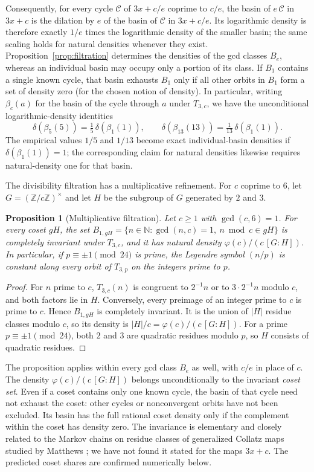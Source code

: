 \documentclass[12pt]{amsart}
\newtheorem{proposition}{Proposition}
\theoremstyle{definition}
\theoremstyle{remark}
\newcommand{\N}{\mathbb{N}}
\begin{document}
Consequently, for every cycle $\mathcal C$ of $3x+c/e$ coprime to $c/e$, the basin of $e\,\mathcal C$ in $3x+c$ is the dilation by $e$ of the basin of $\mathcal C$ in $3x+c/e$. Its logarithmic density is therefore exactly $1/e$ times the logarithmic density of the smaller basin; the same scaling holds for natural densities whenever they exist. Proposition~\ref{prop:filtration} determines the densities of the gcd classes $B_e$, whereas an individual basin may occupy only a portion of its class. If $B_1$ contains a single known cycle, that basin exhausts $B_1$ only if all other orbits in $B_1$ form a set of density zero (for the chosen notion of density). In particular, writing $\beta_c(a)$ for the basin of the cycle through $a$ under $T_{3,c}$, we have the unconditional logarithmic-density identities
\[
\delta(\beta_5(5))=\tfrac15\,\delta(\beta_1(1)),\qquad
\delta(\beta_{13}(13))=\tfrac1{13}\,\delta(\beta_1(1)).
\]
The empirical values $1/5$ and $1/13$ become exact individual-basin densities if $\delta(\beta_1(1))=1$; the corresponding claim for natural densities likewise requires natural-density one for that basin.

The divisibility filtration has a multiplicative refinement. For $c$ coprime to $6$, let $G=(\mathbb Z/c\mathbb Z)^\times$ and let $H$ be the subgroup of $G$ generated by $2$ and $3$.

\begin{proposition}[Multiplicative filtration]
\label{prop:cosets}
Let $c\ge1$ with $\gcd(c,6)=1$. For every coset $gH$, the set $B_{1,gH}=\{n\in\N:\gcd(n,c)=1,\ n\bmod c\in gH\}$ is completely invariant under $T_{3,c}$, and it has natural density $\varphi(c)/(c\,[G:H])$. In particular, if $p\equiv\pm1\pmod{24}$ is prime, the Legendre symbol $(n/p)$ is constant along every orbit of $T_{3,p}$ on the integers prime to $p$.
\end{proposition}

\begin{proof}
For $n$ prime to $c$, $T_{3,c}(n)$ is congruent to $2^{-1}n$ or to $3\cdot2^{-1}n$ modulo $c$, and both factors lie in $H$. Conversely, every preimage of an integer prime to $c$ is prime to $c$. Hence $B_{1,gH}$ is completely invariant. It is the union of $|H|$ residue classes modulo $c$, so its density is $|H|/c=\varphi(c)/(c\,[G:H])$. For a prime $p\equiv\pm1\pmod{24}$, both $2$ and $3$ are quadratic residues modulo $p$, so $H$ consists of quadratic residues.
\end{proof}

The proposition applies within every gcd class $B_e$ as well, with $c/e$ in place of $c$. The density $\varphi(c)/(c\,[G:H])$ belongs unconditionally to the invariant \emph{coset set}. Even if a coset contains only one known cycle, the basin of that cycle need not exhaust the coset: other cycles or nonconvergent orbits have not been excluded. Its basin has the full rational coset density only if the complement within the coset has density zero. The invariance is elementary and closely related to the Markov chains on residue classes of generalized Collatz maps studied by Matthews \cite{Matthews_2010}; we have not found it stated for the maps $3x+c$. The predicted coset shares are confirmed numerically below.
\end{document}
